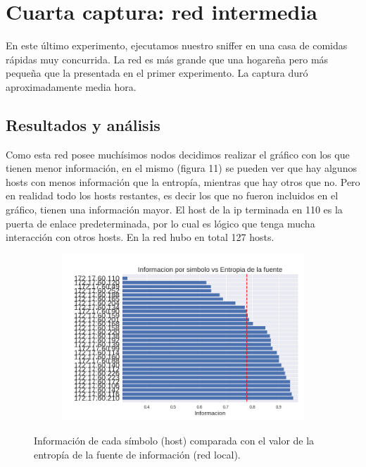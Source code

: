 \section{Cuarta captura: red intermedia}

\par En este último experimento, ejecutamos nuestro sniffer en una casa de comidas rápidas muy concurrida. La red es más grande que una hogareña pero más pequeña que la presentada en el primer experimento. La captura duró aproximadamente media hora.

\subsection{Resultados y análisis}

\par Como esta red posee muchísimos nodos decidimos realizar el gráfico con los que tienen menor información, en el mismo (figura 11) se pueden ver que hay algunos hosts con menos información que la entropía, mientras que hay otros que no. Pero en realidad todo los hosts restantes, es decir los que no fueron incluidos en el gráfico, tienen una información mayor. El host de la ip terminada en 110 es la puerta de enlace predeterminada, por lo cual es lógico que tenga mucha interacción con otros hosts. En la red hubo en total 127 hosts.

\begin{figure}[h]
  \begin{subfigure}{.5\textwidth}
    \includegraphics[width=\textwidth]{imagenes/mc/mchosts.png}
  \end{subfigure}
  \label{fig:exp4_hosts_infovsentro}
  \caption{Información de cada símbolo (host) comparada con el valor de la entropía de la fuente de información (red local).}
\end{figure}

